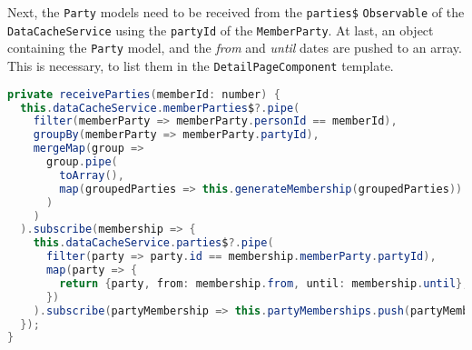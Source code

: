 Next, the \texttt{Party} models need to be received from the \texttt{parties\$} \texttt{Observable} of the \texttt{DataCacheService} using the \texttt{partyId} of the \texttt{MemberParty}.
At last, an object containing the \texttt{Party} model, and the \textit{from} and \textit{until} dates are pushed to an array. This is necessary, to list them in the \texttt{DetailPageComponent} template.
\begin{lstlisting}[label=lst:02_impl_detail_receiveParties, caption=Implementation of the \texttt{receiveParties} method, language=java]
private receiveParties(memberId: number) {
  this.dataCacheService.memberParties$?.pipe(
    filter(memberParty => memberParty.personId == memberId),
    groupBy(memberParty => memberParty.partyId),
    mergeMap(group =>
      group.pipe(
        toArray(),
        map(groupedParties => this.generateMembership(groupedParties))
      )
    )
  ).subscribe(membership => {
    this.dataCacheService.parties$?.pipe(
      filter(party => party.id == membership.memberParty.partyId),
      map(party => {
        return {party, from: membership.from, until: membership.until};
      })
    ).subscribe(partyMembership => this.partyMemberships.push(partyMembership));
  });
}
\end{lstlisting}
